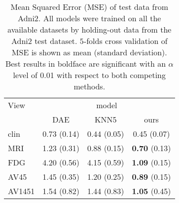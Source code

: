 \begin{table}[!t]
\caption{
Mean Squared Error (MSE) of test data from Adni2.
All models were trained on all the available datasets by holding-out data from the Adni2 test dataset.
$5$-folds cross validation of MSE is shown as mean (standard deviation).
Best results in boldface are significant with an $\alpha$ level of 0.01 with respect to both competing methods.
}
\centering
\label{tab:model_comparison}
\begin{tabular}{lccc}
\toprule
View       &          \multicolumn{3}{c}{model}\\
           &     DAE      &     KNN5     &           ours        \\ \cline{2-4}
clin       &  0.73 (0.14) &  0.44 (0.05) &          0.45 (0.07)  \\
MRI        &  1.23 (0.31) &  0.88 (0.15) &  \textbf{0.70} (0.13) \\
FDG        &  4.20 (0.56) &  4.15 (0.59) &  \textbf{1.09} (0.15) \\
AV45       &  1.45 (0.35) &  1.20 (0.25) &  \textbf{0.89} (0.15) \\
AV1451     &  1.54 (0.82) &  1.44 (0.83) &  \textbf{1.05} (0.45) \\
\bottomrule
\end{tabular}
\end{table}

